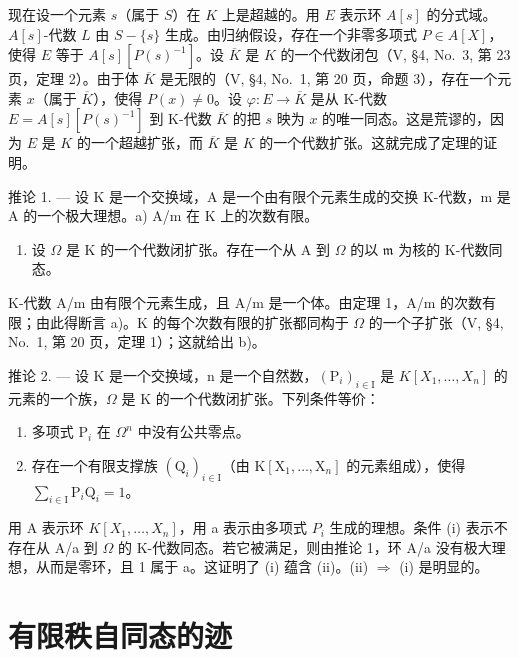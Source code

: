 现在设一个元素 \(s\)（属于 \(S\)）在 \(K\) 上是超越的。用 \(E\) 表示环 \(A[s]\) 的分式域。\(A[s]\)-代数 \(L\) 由 \(S - \{s\}\) 生成。由归纳假设，存在一个非零多项式 \(P \in A[X]\)，使得 \(E\) 等于 \(A[s][P(s)^{-1}]\)。设 \(\overline{K}\) 是 \(K\) 的一个代数闭包（V, §4, No.~3, 第 23 页，定理 2）。由于体 \(\overline{K}\) 是无限的（V, §4, No.~1, 第 20 页，命题 3），存在一个元素 \(x\)（属于 \(\overline{K}\)），使得 \(P(x) \neq 0\)。设 \(\varphi : E \to \overline{K}\) 是从 K-代数 \(E = A[s][P(s)^{-1}]\) 到 K-代数 \(\overline{K}\) 的把 \(s\) 映为 \(x\) 的唯一同态。这是荒谬的，因为 \(E\) 是 \(K\) 的一个超越扩张，而 \(\overline{K}\) 是 \(K\) 的一个代数扩张。这就完成了定理的证明。

推论 1. --- 设 K 是一个交换域，A 是一个由有限个元素生成的交换 K-代数，m 是 A 的一个极大理想。a) A/m 在 K 上的次数有限。

\begin{enumerate}
\def\labelenumi{\alph{enumi})}
\setcounter{enumi}{1}
\tightlist
\item
  设 \(\Omega\) 是 K 的一个代数闭扩张。存在一个从 A 到 \(\Omega\) 的以 \(\mathfrak{m}\) 为核的 K-代数同态。
\end{enumerate}

K-代数 A/m 由有限个元素生成，且 A/m 是一个体。由定理 1，A/m 的次数有限；由此得断言 a)。K 的每个次数有限的扩张都同构于 \(\Omega\) 的一个子扩张（V, §4, No.~1, 第 20 页，定理 1）；这就给出 b)。

推论 2. --- 设 K 是一个交换域，n 是一个自然数，\((\mathrm{P}_{i})_{i\in\mathrm{I}}\) 是 \(K[X_{1},\ldots,X_{n}]\) 的元素的一个族，\(\Omega\) 是 K 的一个代数闭扩张。下列条件等价：

\begin{enumerate}
\def\labelenumi{(\roman{enumi})}
\item
  多项式 \(\mathrm{P}_i\) 在 \(\Omega^n\) 中没有公共零点。
\item
  存在一个有限支撑族 \((\mathrm{Q}_i)_{i\in \mathrm{I}}\)（由 \(\mathrm{K}[\mathrm{X}_1,\dots ,\mathrm{X}_n]\) 的元素组成），使得 \(\sum_{i\in \mathrm{I}}\mathrm{P}_i\mathrm{Q}_i = 1\)。
\end{enumerate}

用 A 表示环 \(K[X_{1},\ldots,X_{n}]\)，用 a 表示由多项式 \(P_{i}\) 生成的理想。条件 (i) 表示不存在从 A/a 到 \(\Omega\) 的 K-代数同态。若它被满足，则由推论 1，环 A/a 没有极大理想，从而是零环，且 1 属于 a。这证明了 (i) 蕴含 (ii)。(ii) \(\Rightarrow\) (i) 是明显的。

\chapter{有限秩自同态的迹}

